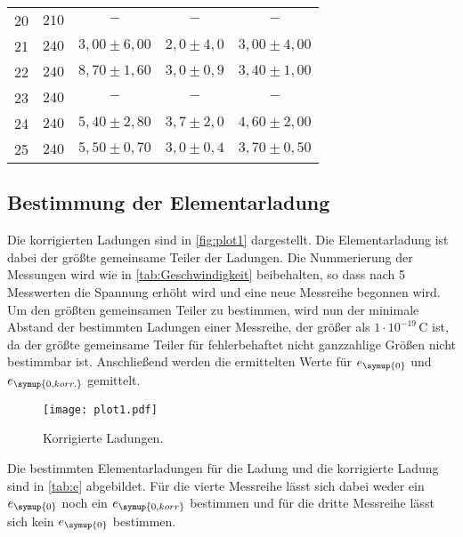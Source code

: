 \begin{table}
\begin{tabular}{c | c c c c}
    20 & $210$ & $-$              & $-$             & $-$               \\
    21 & $240$ & $3,00 \pm 6,00$  & $2,0 \pm 4,0$   & $3,00 \pm 4,00$   \\
    22 & $240$ & $8,70 \pm 1,60$  & $3,0 \pm 0,9$   & $3,40 \pm 1,00$   \\
    23 & $240$ & $-$              & $-$             & $-$               \\
    24 & $240$ & $5,40 \pm 2,80$  & $3,7 \pm 2,0$   & $4,60 \pm 2,00$   \\
    25 & $240$ & $5,50 \pm 0,70$  & $3,0 \pm 0,4$   & $3,70 \pm 0,50$   \\
    \bottomrule
  \end{tabular}
\end{table}

\subsection{Bestimmung der Elementarladung}
\label{sec:Elementarladung}
Die korrigierten Ladungen sind in \autoref{fig:plot1} dargestellt. Die Elementarladung ist dabei der größte
gemeinsame Teiler der Ladungen. Die Nummerierung der Messungen wird wie in \autoref{tab:Geschwindigkeit}
beibehalten, so dass nach 5 Messwerten die Spannung erhöht wird und eine neue Messreihe begonnen wird. Um den
größten gemeinsamen Teiler zu bestimmen, wird nun der minimale Abstand der bestimmten Ladungen einer Messreihe,
der größer als $1\cdot 10^{-19}\,\si{\coulomb}$ ist, da der größte gemeinsame Teiler für fehlerbehaftet nicht
ganzzahlige Größen nicht bestimmbar ist. Anschließend werden die ermittelten Werte für $e_{\symup{0}}$
und $e_{\symup{0, korr.}}$ gemittelt.
\begin{figure}
  \centering
  \texttt{[image: plot1.pdf]}
  \caption{Korrigierte Ladungen.}
  \label{fig:plot1}
\end{figure}
Die bestimmten Elementarladungen für die Ladung und die korrigierte Ladung sind in \autoref{tab:e} abgebildet.
Für die vierte Messreihe lässt sich dabei weder ein $e_{\symup{0}}$ noch ein $e_{\symup{0, korr}}$ bestimmen
und für die dritte Messreihe lässt sich kein $e_{\symup{0}}$ bestimmen.
